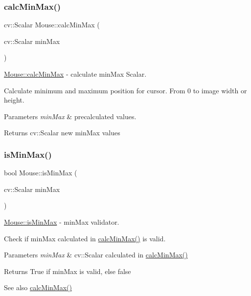 \subsubsection{\texorpdfstring{calcMinMax()}{calcMinMax()}}
{\footnotesize\ttfamily cv\+::\+Scalar Mouse\+::calc\+Min\+Max (\begin{DoxyParamCaption}\item[{cv\+::\+Scalar}]{min\+Max }\end{DoxyParamCaption})\hspace{0.3cm}{\ttfamily [protected]}}



\mbox{\hyperlink{class_mouse_ad1e0ab2dbcf1172d7969b50b8a770060}{Mouse\+::calc\+Min\+Max}} -\/ calculate min\+Max Scalar. 

Calculate minimum and maximum position for cursor. From 0 to image width or height. 
\begin{DoxyParams}{Parameters}
{\em min\+Max} & precalculated values. \\
\hline
\end{DoxyParams}
\begin{DoxyReturn}{Returns}
cv\+::\+Scalar new min\+Max values 
\end{DoxyReturn}
\mbox{\label{class_mouse_a0f6dd164ad2b506a001d23d4f67dbcec}} 
\subsubsection{\texorpdfstring{isMinMax()}{isMinMax()}}
{\footnotesize\ttfamily bool Mouse\+::is\+Min\+Max (\begin{DoxyParamCaption}\item[{cv\+::\+Scalar}]{min\+Max }\end{DoxyParamCaption})\hspace{0.3cm}{\ttfamily [protected]}}



\mbox{\hyperlink{class_mouse_a0f6dd164ad2b506a001d23d4f67dbcec}{Mouse\+::is\+Min\+Max}} -\/ min\+Max validator. 

Check if min\+Max calculated in \mbox{\hyperlink{class_mouse_ad1e0ab2dbcf1172d7969b50b8a770060}{calc\+Min\+Max()}} is valid. 
\begin{DoxyParams}{Parameters}
{\em min\+Max} & cv\+::\+Scalar calculated in \mbox{\hyperlink{class_mouse_ad1e0ab2dbcf1172d7969b50b8a770060}{calc\+Min\+Max()}} \\
\hline
\end{DoxyParams}
\begin{DoxyReturn}{Returns}
True if min\+Max is valid, else false 
\end{DoxyReturn}
\begin{DoxySeeAlso}{See also}
\mbox{\hyperlink{class_mouse_ad1e0ab2dbcf1172d7969b50b8a770060}{calc\+Min\+Max()}} 
\end{DoxySeeAlso}
\mbox{\label{class_mouse_a186e5b7ddfbb4681326286509a064d28}} 
